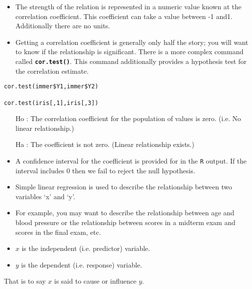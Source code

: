 \documentclass[ModuleBmain.tex]{subfiles}
\begin{document}
\begin{itemize}

\item The strength of the relation is represented in a numeric value known at the correlation coefficient. This coefficient can take a value between -1 and1. Additionally there are no units.

\item Getting a correlation coefficient is generally only half the story; you will want to know if the relationship is significant. There is a more complex command called \texttt{\textbf{cor.test()}}. This command additionally provides a hypothesis test for the correlation estimate.
\end{itemize}
\begin{framed}
\begin{verbatim}
cor.test(immer$Y1,immer$Y2)

cor.test(iris[,1],iris[,3])
\end{verbatim}
\end{framed}

\begin{framed}
\begin{itemize}
\item[Ho] : The correlation coefficient for the population of values is zero. (i.e. No linear relationship.)
\item[Ha]: The coefficient is not zero. (Linear relationship exists.)
\end{itemize}	
\end{framed}

\begin{itemize}
\item A confidence interval for the coefficient is provided for in the \texttt{R} output. If the interval includes 0 then we fail to reject the null hypothesis.

\item Simple linear regression is used to describe the relationship between two variables ‘x’ and ‘y’.

\item 
For example, you may want to describe the relationship between age and blood pressure or the relationship between scores in a midterm exam and scores in the final exam, etc.
\end{itemize}

\begin{itemize}
\item	$x$ is the independent (i.e. predictor) variable.
\item	$y$ is the dependent (i.e. response) variable.
\end{itemize}
That is to say $x$ is said to cause or influence $y$.
\end{document}
